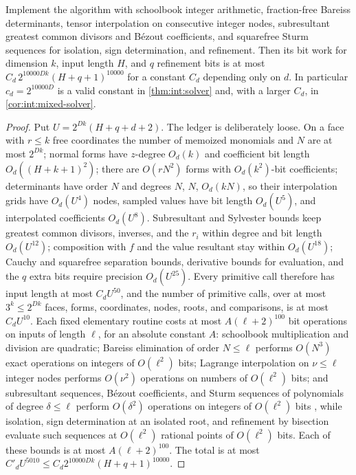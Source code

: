 \begin{lemma}\label{lem:int:budget}
Implement the algorithm with schoolbook integer arithmetic, fraction-free
Bareiss determinants, tensor interpolation on consecutive integer nodes,
subresultant greatest common divisors and B\'ezout coefficients, and squarefree
Sturm sequences for isolation, sign determination, and refinement. Then its bit
work for dimension $k$, input length $H$, and $q$ refinement bits is at most
$C_d\,2^{10000Dk}(H+q+1)^{10000}$ for a constant $C_d$ depending only on $d$. In
particular $c_d=2^{10000D}$ is a valid constant in \cref{thm:int:solver} and,
with a larger $C_d$, in \cref{cor:int:mixed-solver}.
\end{lemma}

\begin{proof}
Put $U=2^{Dk}(H+q+d+2)$. The ledger is deliberately loose. On a face with
$r\le k$ free coordinates the number of memoized monomials and $N$ are at most
$2^{Dk}$; normal forms have $z$-degree $O_d(k)$ and coefficient bit length
$O_d((H+k+1)^2)$; there are $O(rN^2)$ forms with $O_d(k^2)$-bit coefficients;
determinants have order $N$ and degrees $N$, $N$, $O_d(kN)$, so their
interpolation grids have $O_d(U^4)$ nodes, sampled values have bit length
$O_d(U^5)$, and interpolated coefficients $O_d(U^8)$. Subresultant and Sylvester
bounds keep greatest common divisors, inverses, and the $r_i$ within degree and
bit length $O_d(U^{12})$; composition with $f$ and the value resultant stay
within $O_d(U^{18})$; Cauchy and squarefree separation bounds, derivative bounds
for evaluation, and the $q$ extra bits require precision $O_d(U^{25})$. Every
primitive call therefore has input length at most $C_dU^{50}$, and the number of
primitive calls, over at most $3^k\le2^{Dk}$ faces, forms, coordinates, nodes,
roots, and comparisons, is at most $C_dU^{10}$. Each fixed elementary routine
costs at most $A(\ell+2)^{100}$ bit operations on inputs of length $\ell$, for an
absolute constant $A$: schoolbook multiplication and division are quadratic;
Bareiss elimination of order $N\le\ell$ performs $O(N^3)$ exact operations on
integers of $O(\ell^2)$ bits; Lagrange interpolation on $\nu\le\ell$ integer
nodes performs $O(\nu^2)$ operations on numbers of $O(\ell^2)$ bits; and
subresultant sequences, B\'ezout coefficients, and Sturm sequences of
polynomials of degree $\delta\le\ell$ perform $O(\delta^2)$ operations on
integers of $O(\ell^2)$ bits \citep{basu2006-algorithms-in-real-algebraic-geometry}, while isolation, sign
determination at an isolated root, and refinement by bisection evaluate
such sequences at $O(\ell^2)$ rational points of $O(\ell^2)$ bits. Each of
these bounds is at most $A(\ell+2)^{100}$. The total is at most
$C'_dU^{5010}\le C_d2^{10000Dk}(H+q+1)^{10000}$.
\end{proof}

